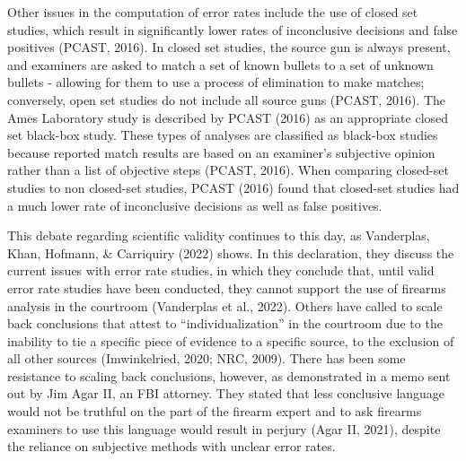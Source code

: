 \documentclass[print]{nuthesis}
\begin{document}
Other issues in the computation of error rates include the use of closed set studies, which result in significantly lower rates of inconclusive decisions and false positives (PCAST, 2016).
In closed set studies, the source gun is always present, and examiners are asked to match a set of known bullets to a set of unknown bullets - allowing for them to use a process of elimination to make matches; conversely, open set studies do not include all source guns (PCAST, 2016).
The Ames Laboratory study is described by PCAST (2016) as an appropriate closed set black-box study.
These types of analyses are classified as black-box studies because reported match results are based on an examiner's subjective opinion rather than a list of objective steps (PCAST, 2016).
When comparing closed-set studies to non closed-set studies, PCAST (2016) found that closed-set studies had a much lower rate of inconclusive decisions as well as false positives.

This debate regarding scientific validity continues to this day, as Vanderplas, Khan, Hofmann, \& Carriquiry (2022) shows.
In this declaration, they discuss the current issues with error rate studies, in which they conclude that, until valid error rate studies have been conducted, they cannot support the use of firearms analysis in the courtroom (Vanderplas et al., 2022).
Others have called to scale back conclusions that attest to ``individualization'' in the courtroom due to the inability to tie a specific piece of evidence to a specific source, to the exclusion of all other sources (Imwinkelried, 2020; NRC, 2009).
There has been some resistance to scaling back conclusions, however, as demonstrated in a memo sent out by Jim Agar II, an FBI attorney.
They stated that less conclusive language would not be truthful on the part of the firearm expert and to ask firearms examiners to use this language would result in perjury (Agar II, 2021), despite the reliance on subjective methods with unclear error rates.
\end{document}
